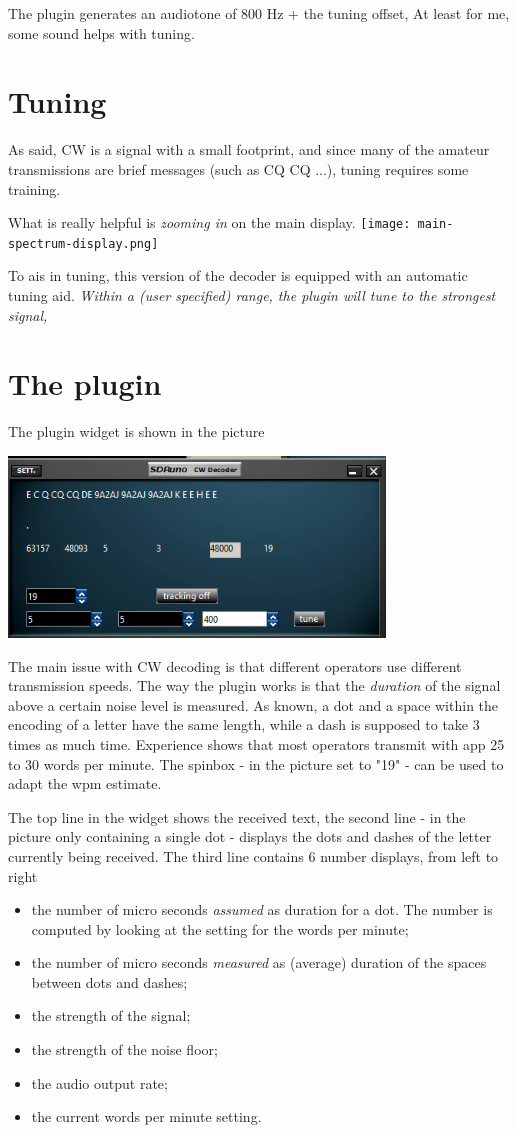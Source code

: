 \documentclass[11pt]{article}
\begin{document}
The plugin generates an audiotone of 800 Hz + the tuning offset,
At least for me, some sound helps with tuning.

\section{Tuning}
As said, CW is a signal with a small footprint, and since many of
the amateur transmissions are brief messages (such as CQ CQ ...), tuning
requires some training.
\par
What is really helpful is {\em zooming in} on the main display.
\texttt{[image: main-spectrum-display.png]}

To ais in tuning, this version of the decoder is equipped with
an automatic tuning aid.
{\em Within a (user specified) range, the plugin will tune to the strongest signal,}

\section{The plugin}
The plugin widget  is shown in the picture

\includegraphics[width=100mm]{cw-plugin-widget.png}

The main issue with CW decoding is that different operators use different
transmission speeds.
The way the plugin works is that the {\em duration} of the signal above
a certain noise level is measured. As known, a dot and a space within the
encoding of a letter have the same length, while a dash is supposed to take 3 times as much time.
Experience shows that most operators transmit with app 25 to 30 words per
minute. The spinbox - in the picture set to "19" - can be used to adapt 
the wpm estimate.

The top line in the widget shows the received text,
the second line - in the picture only containing a single dot -
displays the dots and dashes of the letter currently being received.
The third line contains 6 number displays, from left to right
\begin{itemize}
\item the number of micro seconds {\em assumed} as duration for a dot. The 
number is computed by looking at the setting for the words per minute;
\item the number of micro seconds {\em measured} as (average) duration of
the spaces between dots and dashes;
\item the strength of the signal;
\item the strength of the noise floor;
\item the audio output rate; 
\item the current words per minute setting.
\end{itemize}
\end{document}
